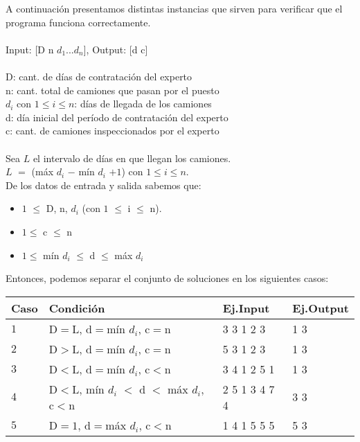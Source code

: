\documentclass[11pt, a4paper, twoside]{article}
\begin{document}
A continuación presentamos distintas instancias que sirven para verificar que el programa funciona correctamente. \\ 
\\
Input: [D n $d_1$...$d_n$], Output: [d c] \\
\\
D: cant. de días de contratación del experto \\
n: cant.  total de camiones que pasan por el puesto \\
$d_i$ con $1 \le i \le n$: días de llegada de los camiones \\
d: día inicial del período de contratación del experto \\
c: cant. de camiones inspeccionados por el experto \\  
\\
Sea $L$ el intervalo de días en que llegan los camiones. \\
$L$ $=$ (máx $d_i$ $-$ mín $d_i$ $+ 1$) con $1 \le i \le n$. \\

De los datos de entrada y salida sabemos que: 

\begin{itemize}
    \item $1$ $\le$ D, n, $d_i$ (con $1$ $\le$ i $\le$ n).
  \item $1 \le $ c $\le$ n 
  \item $1 \le $ mín $d_i$ $\le$ d $\le$ máx $d_i$ 
\end{itemize}

Entonces, podemos separar el conjunto de soluciones en los siguientes casos: \\

\begin{tabular}{|l|l|l|l|}
  \hline
  Caso &  Condición                           & Ej.Input      & Ej.Output \\
  \hline
  $1$  &  D$=$L, d$=$mín $d_i$, c$=$n             & 3 3 1 2 3     & 1 3 \\  
  $2$  &  D$>$L, d$=$mín $d_i$, c$=$n               & 5 3 1 2 3     & 1 3 \\
  \hline  
  $3$  &  D$<$L, d$=$mín $d_i$, c$<$n             & 3 4 1 2 5 1   & 1 3 \\
  $4$  &  D$<$L, mín $d_i$ $<$ d $<$ máx $d_i$, c$<$n   & 2 5 1 3 4 7 4 & 3 3 \\
  $5$  &  D$=1$, d$=$máx $d_i$, c$<$n             & 1 4 1 5 5 5   & 5 3 \\  
  \hline
\end{tabular} \\
\end{document}
